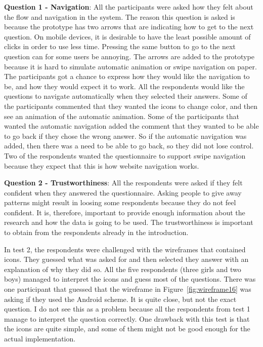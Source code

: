   {\bf Question 1 - Navigation}: All the participants were asked how they felt about the flow and navigation in the system. The reason this question is asked is because the prototype has two arrows that are indicating how to get to the next question. On mobile devices, it is desirable to have the least possible amount of clicks in order to use less time. Pressing the same button to go to the next question can for some users be annoying. The arrows are added to the prototype because it is hard to simulate automatic animation or swipe navigation on paper. The participants got a chance to express how they would like the navigation to be, and how they would expect it to work. All the respondents would like the questions to navigate automatically when they selected their answers. Some of the participants commented that they wanted the icons to change color, and then see an animation of the automatic animation. Some of the participants that wanted the automatic navigation added the comment that they wanted to be able to go back if they chose the wrong answer. So if the automatic navigation was added, then there was a need to be able to go back, so they did not lose control. Two of the respondents wanted the questionnaire to support swipe navigation because they expect that this is how website navigation works.

  {\bf Question 2 - Trustworthiness}: All the respondents were asked if they felt confident when they answered the questionnaire. Asking people to give away patterns might result in loosing some respondents because they do not feel confident. It is, therefore, important to provide enough information about the research and how the data is going to be used. The trustworthiness is important to obtain from the respondents already in the introduction. 

  In test 2, the respondents were challenged with the wireframes that contained icons. They guessed what was asked for and then selected they answer with an explanation of why they did so. All the five respondents (three girls and two boys) managed to interpret the icons and guess most of the questions. There was one participant that guessed that the wireframe in Figure~\ref{fig:wireframe16} was asking if they used the Android scheme. It is quite close, but not the exact question. I do not see this as a problem because all the respondents from test 1 manage to interpret the question correctly. One drawback with this test is that the icons are quite simple, and some of them might not be good enough for the actual implementation. 

